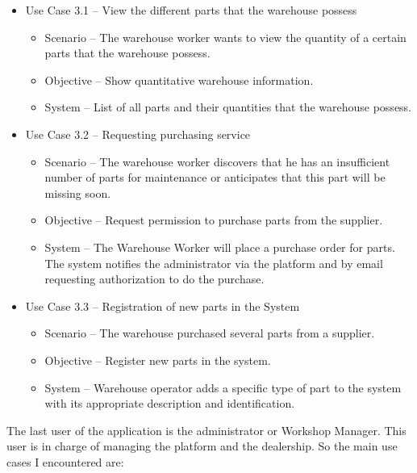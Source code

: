 \begin{itemize}
  \item Use Case 3.1 – View the different parts that the warehouse possess
  \begin{itemize}
    \item Scenario – The warehouse worker wants to view the quantity of a certain parts that the warehouse possess.
    \item Objective – Show quantitative warehouse information.
    \item System – List of all parts and their quantities that the warehouse possess. 
  \end{itemize}
  \item Use Case 3.2 – Requesting purchasing service 
  \begin{itemize}
    \item Scenario – The warehouse worker discovers that he has an insufficient number of parts for maintenance or anticipates that this part will be missing soon.
    \item Objective – Request permission to purchase parts from the supplier.
    \item System – The Warehouse Worker will place a purchase order for parts. The system notifies the administrator via the platform and by email requesting authorization to do the purchase. 
  \end{itemize}
  \item Use Case 3.3 – Registration of new parts in the System
  \begin{itemize}
    \item Scenario – The warehouse purchased several parts from a supplier.
    \item Objective – Register new parts in the system.
    \item System – Warehouse operator adds a specific type of part to the system with its appropriate description and identification.
  \end{itemize}
\end{itemize}
\hfill \break

The last user of the application is the administrator or Workshop Manager. This user is in charge of managing the platform and the dealership. So the main use cases I encountered are:


